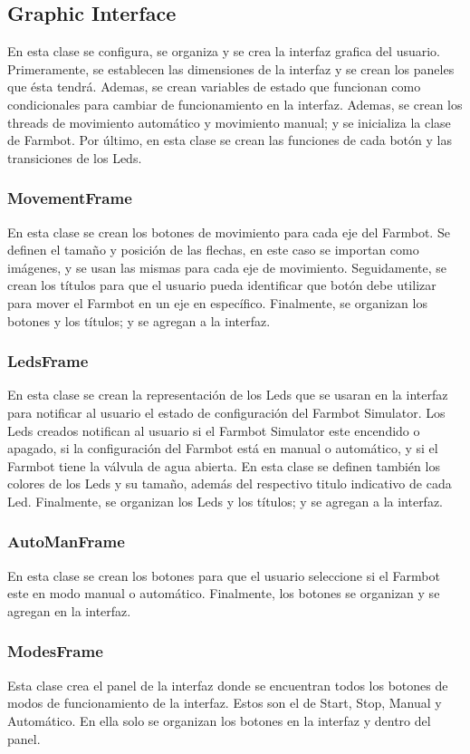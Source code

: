 \documentclass[letterpaper,12pt]{article}
\begin{document}
	\subsection{Graphic Interface}
	En esta clase se configura, se organiza y se crea la interfaz grafica del usuario. Primeramente, se establecen las dimensiones de la interfaz y se crean los paneles que ésta tendrá. Ademas, se crean variables de estado que funcionan como condicionales para cambiar de funcionamiento en la interfaz. Ademas, se crean los threads de movimiento automático y movimiento manual; y se inicializa la clase de Farmbot. Por último, en esta clase se crean las funciones de cada botón y las transiciones de los Leds.
	\subsubsection{MovementFrame}
	En esta clase se crean los botones de movimiento para cada eje del Farmbot. Se definen el tamaño y posición de las flechas, en este caso se importan como imágenes, y se usan las mismas para cada eje de movimiento. Seguidamente, se crean los títulos para que el usuario pueda identificar que botón debe utilizar para mover el Farmbot en un eje en específico. Finalmente, se organizan los botones y los títulos; y se agregan a la interfaz.
	\subsubsection{LedsFrame}
	En esta clase se crean la representación de los Leds que se usaran en la interfaz para notificar al usuario el estado de configuración del Farmbot Simulator. Los Leds creados notifican al usuario si el Farmbot Simulator este encendido o apagado, si la configuración del Farmbot está en manual o automático, y si el Farmbot tiene la válvula de agua abierta. En esta clase se definen también los colores de los Leds y su tamaño, además del respectivo titulo indicativo de cada Led. Finalmente, se organizan los Leds y los títulos; y se agregan a la interfaz.
	\subsubsection{AutoManFrame}
	En esta clase se crean los botones para que el usuario seleccione si el Farmbot este en modo manual o automático. Finalmente, los botones se organizan y se agregan en la interfaz.
	\subsubsection{ModesFrame}
	Esta clase crea el panel de la interfaz donde se encuentran todos los botones de modos de funcionamiento de la interfaz. Estos son el de Start, Stop, Manual y Automático. En ella solo se organizan los botones en la interfaz y dentro del panel.
\end{document}
